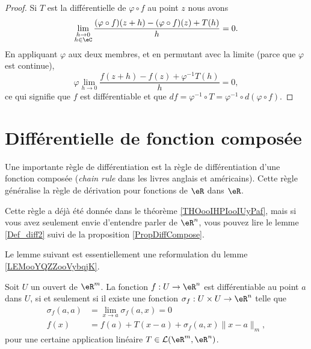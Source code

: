 \begin{proof}
	Si \( T\) est la différentielle de \( \varphi\circ f\) au point \( z\) nous avons
	\begin{equation}
		\lim_{\substack{h\to 0\\h\in \eC}}\frac{ (\varphi\circ f)(z+h)-(\varphi\circ f)(z)+T(h) }{ h }=0.
	\end{equation}
	En appliquant \( \varphi\) aux deux membres, et en permutant avec la limite (parce que \( \varphi\) est continue),
	\begin{equation}
		\varphi\lim_{h\to 0} \frac{ f(z+h)-f(z)+\varphi^{-1} T(h) }{ h }=0,
	\end{equation}
	ce qui signifie que \( f\) est différentiable et que \( df=\varphi^{-1}\circ T=\varphi^{-1}\circ d(\varphi\circ f)\).
\end{proof}

\section{Différentielle de fonction composée}

Une importante règle de différentiation est la règle de différentiation d'une fonction composée (\emph{chain rule} dans les livres anglais et américains). Cette règle généralise la règle de dérivation pour fonctions de \( \eR\) dans \( \eR\).

Cette règle a déjà été donnée dans le théorème \ref{THOooIHPIooIUyPaf}, mais si vous avez seulement envie d'entendre parler de \( \eR^n\), vous pouvez lire le lemme \ref{Def_diff2} suivi de la proposition \ref{PropDiffCompose}.

Le lemme suivant est essentiellement une reformulation du lemme \ref{LEMooYQZZooVybqjK}.
\begin{lemma}\label{Def_diff2}
	Soit \( U\) un ouvert de \( \eR^m\). La fonction \( f: U\to\eR^n\) est différentiable au point \( a\) dans \( U\), si et seulement si il existe une fonction \( \sigma_f: U\times U\to \eR^n\) telle que
	\begin{subequations}		\label{SubEqsDiff2}
		\begin{align}
			\sigma_f(a,a) & =\lim_{x\to a} \sigma_f(a,x)=0                           \\
			f(x)          & =f(a)+T(x-a)+\sigma_f(a,x)\|x-a\|_m,   \label{def_diff2}
		\end{align}
	\end{subequations}
	pour une certaine application linéaire \( T\in\mathcal{L}(\eR^m,\eR^n)\).
\end{lemma}

